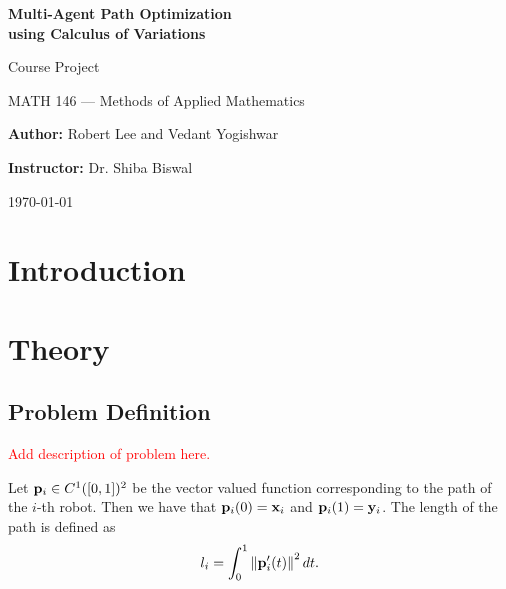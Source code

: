 \documentclass[11pt]{article}
\begin{document}
\begin{titlepage}
    \centering
    \null
    
    {\huge \textbf{Multi-Agent Path Optimization\\using Calculus of Variations}\par}
    \vspace{5mm}
    {\Large \large Course Project\par
    MATH 146 --- Methods of Applied Mathematics\par}
    \vspace{5mm}
    {\large \textbf{Author:} Robert Lee and Vedant Yogishwar\par
    \textbf{Instructor:} Dr. Shiba Biswal\par}
    
    
    {\large \today\par}
\end{titlepage}

\clearpage

\tableofcontents

\clearpage

\begin{abstract}
\lipsum[1-2]
\end{abstract}

\clearpage

\printunsrtglossary[type=symbols,style=long,title={List of Symbols}]

\section{Introduction}

\section{Theory}

\subsection{Problem Definition}

\textcolor{red}{Add description of problem here.}

Let \(\mathbf{p}_i \in C^1([0,1])^2\) be the vector valued function corresponding to the path of the \(i\)-th robot. Then we have that \(\mathbf{p}_i(0) = \mathbf{x}_i\) and \(\mathbf{p}_i(1) = \mathbf{y}_i\). The length of the path is defined as
\begin{equation}
    l_i = \int_0^1 \left\lVert \mathbf{p}_i'(t) \right\rVert^2 dt.
\end{equation}
\end{document}
